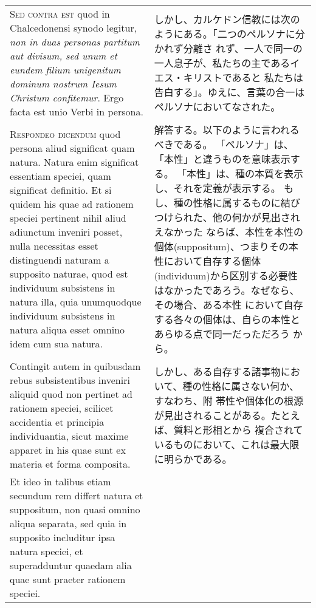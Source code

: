 \documentclass[10pt]{jsarticle} %
\begin{document}
\begin{longtable}{p{21em}p{21em}}
\\



{\scshape Sed contra est} quod in Chalcedonensi synodo legitur, {\itshape non in duas
personas partitum aut divisum, sed unum et eundem filium unigenitum
dominum nostrum Iesum Christum confitemur}. Ergo facta est unio Verbi in
persona.


&

しかし、カルケドン信教には次のようにある。「二つのペルソナに分かれず分離さ
 れず、一人で同一の一人息子が、私たちの主であるイエス・キリストであると
 私たちは告白する」。ゆえに、言葉の合一はペルソナにおいてなされた。


\\



{\scshape Respondeo dicendum} quod persona aliud significat quam natura. Natura
enim significat essentiam speciei, quam significat definitio. Et si
quidem his quae ad rationem speciei pertinent nihil aliud adiunctum
inveniri posset, nulla necessitas esset distinguendi naturam a supposito
naturae, quod est individuum subsistens in natura illa, quia unumquodque
individuum subsistens in natura aliqua esset omnino idem cum sua
natura. 


&

解答する。以下のように言われるべきである。
「ペルソナ」は、「本性」と違うものを意味表示する。
「本性」は、種の本質を表示し、それを定義が表示する。
もし、種の性格に属するものに結びつけられた、他の何かが見出されえなかった
 ならば、本性を本性の個体(suppositum)、つまりその本性において自存する個体(individuum)から区別する必要性はなかったであろう。なぜなら、その場合、ある本性
 において自存する各々の個体は、自らの本性とあらゆる点で同一だっただろう
 から。

\\

Contingit autem in quibusdam rebus subsistentibus inveniri
aliquid quod non pertinet ad rationem speciei, scilicet accidentia et
principia individuantia, sicut maxime apparet in his quae sunt ex
materia et forma composita. 

&

しかし、ある自存する諸事物において、種の性格に属さない何か、すなわち、附
 帯性や個体化の根源が見出されることがある。たとえば、質料と形相とから
 複合されているものにおいて、これは最大限に明らかである。

\\

Et ideo in talibus etiam secundum rem
differt natura et suppositum, non quasi omnino aliqua separata, sed quia
in supposito includitur ipsa natura speciei, et superadduntur quaedam
alia quae sunt praeter rationem speciei. 



\end{longtable}
\end{document}
